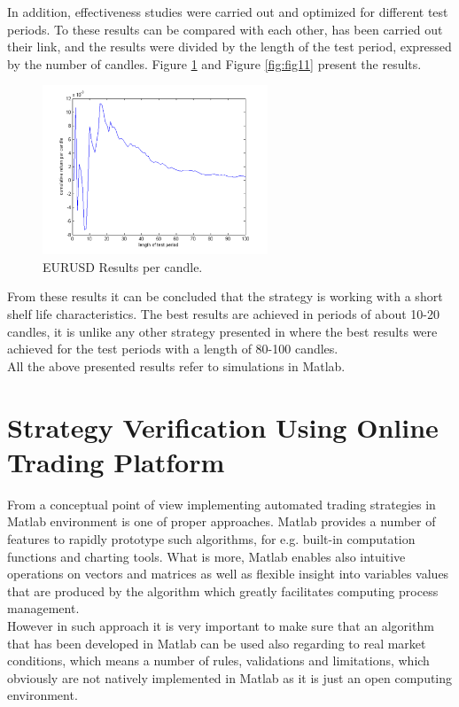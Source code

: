 \documentclass[runningheads,a4paper]{llncs}
\begin{document}
In addition, effectiveness studies were carried out and optimized for different test periods. To these results can be compared with each other, has been carried out their link, and the results were divided by the length of the test period, expressed by the number of candles. 
Figure \ref{fig:fig10} and Figure \ref{fig:fig11} present the results.

\begin{figure}[h!]
\centering
\includegraphics[width = 0.6\textwidth]{figures/rys10.png}
\caption{EURUSD Results per candle.}
\label{fig:fig10}
\end{figure}
\FloatBarrier


From these results it can be concluded that the strategy is working with a short shelf life characteristics. The best results are achieved in periods of about 10-20 candles, it is unlike any other strategy presented in \cite{Wilinski2014} where the best results were achieved for the test periods with a length of 80-100 candles.\\
All the above presented results refer to simulations in Matlab.

\section{Strategy Verification Using Online Trading Platform}
From a conceptual point of view implementing automated trading strategies in Matlab environment is one of proper approaches. Matlab provides a number of features to rapidly prototype such algorithms, for e.g. built-in computation functions and charting tools. What is more, Matlab enables also intuitive operations on vectors and matrices as well as flexible insight into variables values that are produced by the algorithm which greatly facilitates computing process management.\\

However in such approach it is very important to make sure that an algorithm that has been developed in Matlab can be used also regarding to real market conditions, which means a number of rules, validations and limitations, which obviously are not natively implemented in Matlab as it is just an open computing environment.\\
\end{document}
